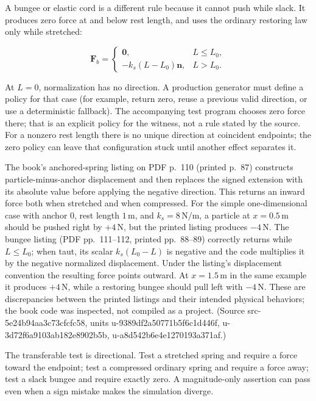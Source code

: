 A bungee or elastic cord is a different rule because it cannot push while slack. It produces zero force at and below rest length, and uses the ordinary restoring law only while stretched:

\[
\mathbf F_b=
\begin{cases}
\mathbf 0,&L\le L_0,\\
-k_s(L-L_0)\mathbf n,&L>L_0.
\end{cases}
\]

At \(L=0\), normalization has no direction. A production generator must define a policy for that case (for example, return zero, reuse a previous valid direction, or use a deterministic fallback). The accompanying test program chooses zero force there; that is an explicit policy for the witness, not a rule stated by the source. For a nonzero rest length there is no unique direction at coincident endpoints; the zero policy can leave that configuration stuck until another effect separates it.

The book's anchored-spring listing on PDF p.~110 (printed p.~87) constructs particle-minus-anchor displacement and then replaces the signed extension with its absolute value before applying the negative direction. This returns an inward force both when stretched and when compressed. For the simple one-dimensional case with anchor \(0\), rest length \(1\,\mathrm m\), and \(k_s=8\,\mathrm{N/m}\), a particle at \(x=0.5\,\mathrm m\) should be pushed right by \(+4\,\mathrm N\), but the printed listing produces \(-4\,\mathrm N\). The bungee listing (PDF pp.~111--112, printed pp.~88--89) correctly returns while \(L\le L_0\); when taut, its scalar \(k_s(L_0-L)\) is negative and the code multiplies it by the negative normalized displacement. Under the listing's displacement convention the resulting force points outward. At \(x=1.5\,\mathrm m\) in the same example it produces \(+4\,\mathrm N\), while a restoring bungee should pull left with \(-4\,\mathrm N\). These are discrepancies between the printed listings and their intended physical behaviors; the book code was inspected, not compiled as a project. (Source src-5e24b94aa3c73cfcfc58, units u-9389df2a50771b5f6c1d446f, u-3d72f6a9103ab182e8902b5b, u-a8d542b6e4e1270193a371af.)

The transferable test is directional. Test a stretched spring and require a force toward the endpoint; test a compressed ordinary spring and require a force away; test a slack bungee and require exactly zero. A magnitude-only assertion can pass even when a sign mistake makes the simulation diverge.


